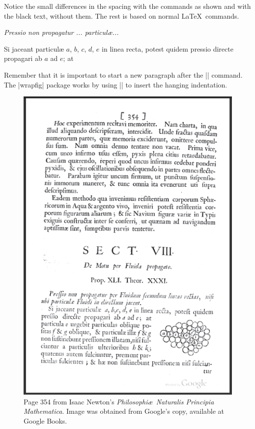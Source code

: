 \vspace*{-37pt}


Notice the small differences in the spacing with the commands as shown and with the black text, without them. The rest is based on normal \LaTeX\ commands.

\textit{Pressio non propagatur ... particul{\ae}...}


Si jaceant particul{\ae} $a$, $b$, $c$, $d$,
$e$ in linea recta, potest quidem
pressio directe propagari ab $a$ ad $e$; at


Remember that it is important to start a new paragraph after the |\pngright| command. The |wrapfig| package works by using |\everypar| to insert the hanging indentation.

\begin{figure}[p]
\centering
\includegraphics[scale=1]{images/page354}
\caption{Page 354 from Isaac Newton's \textit{Philosophi\ae\  Naturalis Principia Mathematica}. Image was obtained from Google's copy, available at Google Books.}
\label{fig:principia}
\end{figure}
